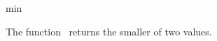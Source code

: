 \begin{ccRefFunction}{min}

\ccDefinition

The function \ccRefName\ returns the smaller of two values.



\ccSeeAlso

\\

\end{ccRefFunction}

